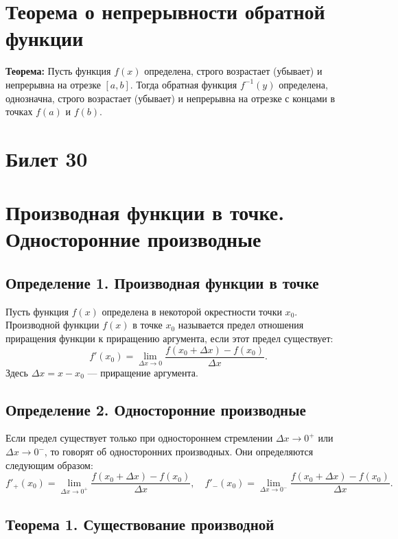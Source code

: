 \documentclass{article}
\begin{document}
\section*{Теорема о непрерывности обратной функции}

\textbf{Теорема:} Пусть функция \( f(x) \) определена, строго возрастает (убывает) и непрерывна на отрезке \([a, b]\). Тогда обратная функция \( f^{-1}(y) \) определена, однозначна, строго возрастает (убывает) и непрерывна на отрезке с концами в точках \( f(a) \) и \( f(b) \).

\section{Билет 30}

\section*{Производная функции в точке. Односторонние производные}

\subsection{Определение 1. Производная функции в точке}

Пусть функция \( f(x) \) определена в некоторой окрестности точки \( x_0 \). Производной функции \( f(x) \) в точке \( x_0 \) называется предел отношения приращения функции к приращению аргумента, если этот предел существует:
\[
f'(x_0) = \lim\limits_{\Delta x \to 0} \frac{f(x_0 + \Delta x) - f(x_0)}{\Delta x}.
\]
Здесь \( \Delta x = x - x_0 \) — приращение аргумента.

\subsection{Определение 2. Односторонние производные}

Если предел существует только при одностороннем стремлении \( \Delta x \to 0^+ \) или \( \Delta x \to 0^- \), то говорят об односторонних производных. Они определяются следующим образом:
\[
f'_+(x_0) = \lim\limits_{\Delta x \to 0^+} \frac{f(x_0 + \Delta x) - f(x_0)}{\Delta x}, \quad
f'_-(x_0) = \lim\limits_{\Delta x \to 0^-} \frac{f(x_0 + \Delta x) - f(x_0)}{\Delta x}.
\]

\subsection{Теорема 1. Существование производной}
\end{document}

